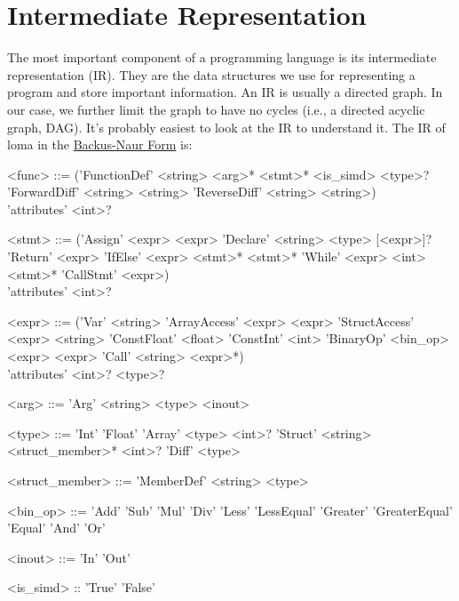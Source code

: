 \section{Intermediate Representation}
\label{sec:IR}

The most important component of a programming language is its intermediate representation (IR). They are the data structures we use for representing a program and store important information. An IR is usually a directed graph. In our case, we further limit the graph to have no cycles (i.e., a directed acyclic graph, DAG). It's probably easiest to look at the IR to understand it. 
The IR of loma in the \href{https://en.wikipedia.org/wiki/Backus%E2%80%93Naur_form}{Backus-Naur Form} is:
\begin{grammar}
<func> ::= ('FunctionDef' <string> <arg>* <stmt>* <is_simd> <type>?
\alt 'ForwardDiff' <string> <string>
\alt 'ReverseDiff' <string> <string>) \\
'attributes' <int>?

<stmt> ::= ('Assign' <expr> <expr>
\alt 'Declare' <string> <type> [<expr>]? 
\alt 'Return' <expr>
\alt 'IfElse' <expr> <stmt>* <stmt>*
\alt 'While' <expr> <int> <stmt>*
\alt 'CallStmt' <expr>) \\
'attributes' <int>?

<expr> ::= ('Var' <string>
\alt 'ArrayAccess' <expr> <expr>
\alt 'StructAccess' <expr> <string>
\alt 'ConstFloat' <float>
\alt 'ConstInt' <int>
\alt 'BinaryOp' <bin_op> <expr> <expr>
\alt 'Call' <string> <expr>*) \\
'attributes' <int>? <type>?

<arg> ::= 'Arg' <string> <type> <inout>

<type> ::= 'Int'
\alt 'Float'
\alt 'Array' <type> <int>?
\alt 'Struct' <string> <struct_member>* <int>?
\alt 'Diff' <type>

<struct_member> ::= 'MemberDef' <string> <type>

<bin_op> ::= 'Add'
\alt 'Sub'
\alt 'Mul'
\alt 'Div'
\alt 'Less'
\alt 'LessEqual'
\alt 'Greater'
\alt 'GreaterEqual'
\alt 'Equal'
\alt 'And'
\alt 'Or'

<inout> ::= 'In' \alt 'Out'

<is_simd> :: 'True' \alt 'False'
\end{grammar}

